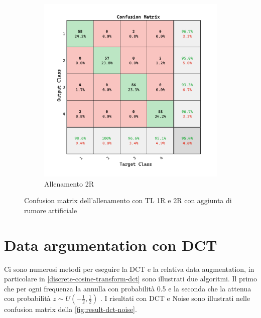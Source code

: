 \begin{figure}[H]
\begin{subfigure}{0.49\textwidth}
        \includegraphics[width=\textwidth]{addestramento-rete-neurale/two-noise.pdf}
        \caption{Allenamento 2R} 
    \end{subfigure}
    \caption{Confusion matrix dell'allenamento con TL 1R e 2R con aggiunta di rumore artificiale}
    \label{fig:result-noise}
\end{figure}

\section{Data argumentation con DCT}\label{data-argumentation-con-dct}

Ci sono numerosi metodi per eseguire la DCT e la relativa data augmentation, in particolare in \cref{discrete-cosine-transform-dct} sono illustrati due algoritmi. Il primo che per ogni frequenza la annulla con probabilità 0.5 e la seconda che la attenua con probabilità \(z\sim U\left(-\frac{1}{2}, \frac{1}{2}\right)\) \cite{nanni_dct_pca}. I risultati con DCT e Noise sono illustrati nelle confusion matrix della \cref{fig:result-dct-noise}.

